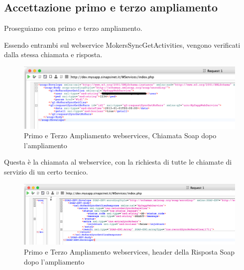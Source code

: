 \subsection{Accettazione primo e terzo ampliamento}
\begin{flushleft}
	Proseguiamo con primo e terzo ampliamento.
	
	Essendo entrambi sul webservice MokersSyncGetActivities, vengono verificati dalla stessa chiamata e risposta.
\end{flushleft}
\begin{figure}[!h] 
	\centering
	\includegraphics[scale = 0.5]{immagini/webservices/ampliamenti/accettazione/3ampl_soap_chiamata.png}
	\caption{Primo e Terzo Ampliamento webservices, Chiamata Soap dopo l'ampliamento}
\end{figure}

\begin{flushleft}
	Questa è la chiamata al webservice, con la richiesta di tutte le chiamate di servizio di un certo tecnico.
\end{flushleft}

\begin{figure}[!h] 
	\centering
	\includegraphics[scale = 0.5]{immagini/webservices/ampliamenti/accettazione/3ampl__risposta_soap_header.png}
	\caption{Primo e Terzo Ampliamento webservices, header della Risposta Soap dopo l'ampliamento}
\end{figure}


